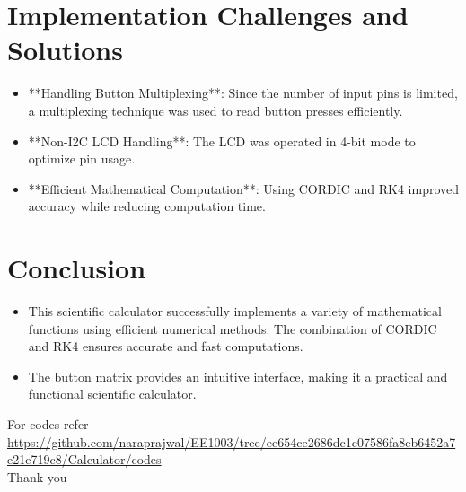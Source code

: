\documentclass[a4paper,12pt]{article}
\begin{document}
\section{Implementation Challenges and Solutions}
\begin{itemize}
    \item **Handling Button Multiplexing**: Since the number of input pins is limited, a multiplexing technique was used to read button presses efficiently.
    \item **Non-I2C LCD Handling**: The LCD was operated in 4-bit mode to optimize pin usage.
    \item **Efficient Mathematical Computation**: Using CORDIC and RK4 improved accuracy while reducing computation time.
\end{itemize}

\section{Conclusion}
\begin{itemize}
    \item This scientific calculator successfully implements a variety of mathematical functions using efficient numerical methods. The combination of CORDIC and RK4 ensures accurate and fast computations.
    \item The button matrix provides an intuitive interface, making it a practical and functional scientific calculator.
\end{itemize}
For codes refer\\
\url{https://github.com/naraprajwal/EE1003/tree/ee654ce2686dc1c07586fa8eb6452a7e21e719c8/Calculator/codes}\\

\centering
Thank you
\end{document}

